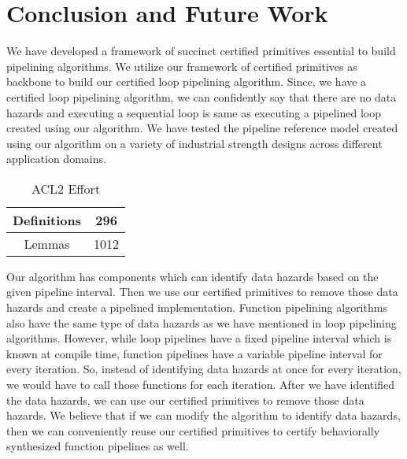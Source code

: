 \section{Conclusion and Future Work}
\label{sec:research-plan}

We have developed a framework of succinct certified primitives essential to build pipelining algorithms. We utilize our framework of certified primitives as backbone to build our certified loop pipelining algorithm. Since, we have a certified loop pipelining algorithm, we can confidently say that there are no data hazards and executing a sequential loop is same as executing a pipelined loop created using our algorithm. We have tested the pipeline reference model created using our algorithm on a variety of industrial strength designs across different application domains. %

\begin{table}
  \centering
  \label{fig:proof}
  \begin{tabular}{| c | c |}
    \hline
    Definitions & 296 \\
    \hline
    Lemmas & 1012 \\
    \hline
  \end{tabular}
        \caption{ACL2 Effort}
\end{table}

Our algorithm has components which can identify data hazards based on the given pipeline interval. Then we use our certified primitives to remove those data hazards and create a pipelined implementation. Function pipelining algorithms also have the same type of data hazards as we have mentioned in loop pipelining algorithms. However, while loop pipelines have a fixed pipeline interval which is known at compile time, function pipelines have a variable pipeline interval for every iteration. So, instead of identifying data hazards at once for every iteration, we would have to call those functions for each iteration. After we have identified the data hazards, we can use our certified primitives to remove those data hazards. We believe that if we can modify the algorithm to identify data hazards, then we can conveniently reuse our certified primitives to certify behaviorally synthesized function pipelines as well.     